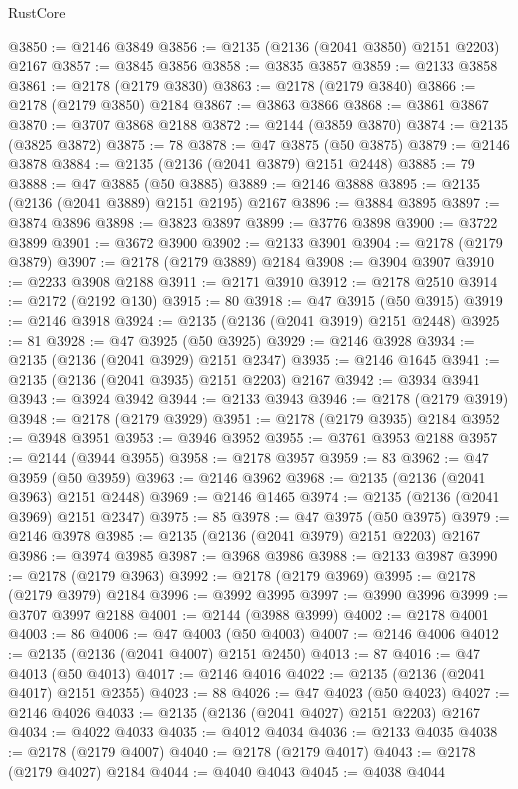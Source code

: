 \begin{lexlean}{RustCore}
\begin{coremodule}
@3850 := @2146 @3849
@3856 := @2135 (@2136 (@2041 @3850) @2151 @2203) @2167
@3857 := @3845 @3856
@3858 := @3835 @3857
@3859 := @2133 @3858
@3861 := @2178 (@2179 @3830)
@3863 := @2178 (@2179 @3840)
@3866 := @2178 (@2179 @3850) @2184
@3867 := @3863 @3866
@3868 := @3861 @3867
@3870 := @3707 @3868 @2188
@3872 := @2144 (@3859 @3870)
@3874 := @2135 (@3825 @3872)
@3875 := 78
@3878 := @47 @3875 (@50 @3875)
@3879 := @2146 @3878
@3884 := @2135 (@2136 (@2041 @3879) @2151 @2448)
@3885 := 79
@3888 := @47 @3885 (@50 @3885)
@3889 := @2146 @3888
@3895 := @2135 (@2136 (@2041 @3889) @2151 @2195) @2167
@3896 := @3884 @3895
@3897 := @3874 @3896
@3898 := @3823 @3897
@3899 := @3776 @3898
@3900 := @3722 @3899
@3901 := @3672 @3900
@3902 := @2133 @3901
@3904 := @2178 (@2179 @3879)
@3907 := @2178 (@2179 @3889) @2184
@3908 := @3904 @3907
@3910 := @2233 @3908 @2188
@3911 := @2171 @3910
@3912 := @2178 @2510
@3914 := @2172 (@2192 @130)
@3915 := 80
@3918 := @47 @3915 (@50 @3915)
@3919 := @2146 @3918
@3924 := @2135 (@2136 (@2041 @3919) @2151 @2448)
@3925 := 81
@3928 := @47 @3925 (@50 @3925)
@3929 := @2146 @3928
@3934 := @2135 (@2136 (@2041 @3929) @2151 @2347)
@3935 := @2146 @1645
@3941 := @2135 (@2136 (@2041 @3935) @2151 @2203) @2167
@3942 := @3934 @3941
@3943 := @3924 @3942
@3944 := @2133 @3943
@3946 := @2178 (@2179 @3919)
@3948 := @2178 (@2179 @3929)
@3951 := @2178 (@2179 @3935) @2184
@3952 := @3948 @3951
@3953 := @3946 @3952
@3955 := @3761 @3953 @2188
@3957 := @2144 (@3944 @3955)
@3958 := @2178 @3957
@3959 := 83
@3962 := @47 @3959 (@50 @3959)
@3963 := @2146 @3962
@3968 := @2135 (@2136 (@2041 @3963) @2151 @2448)
@3969 := @2146 @1465
@3974 := @2135 (@2136 (@2041 @3969) @2151 @2347)
@3975 := 85
@3978 := @47 @3975 (@50 @3975)
@3979 := @2146 @3978
@3985 := @2135 (@2136 (@2041 @3979) @2151 @2203) @2167
@3986 := @3974 @3985
@3987 := @3968 @3986
@3988 := @2133 @3987
@3990 := @2178 (@2179 @3963)
@3992 := @2178 (@2179 @3969)
@3995 := @2178 (@2179 @3979) @2184
@3996 := @3992 @3995
@3997 := @3990 @3996
@3999 := @3707 @3997 @2188
@4001 := @2144 (@3988 @3999)
@4002 := @2178 @4001
@4003 := 86
@4006 := @47 @4003 (@50 @4003)
@4007 := @2146 @4006
@4012 := @2135 (@2136 (@2041 @4007) @2151 @2450)
@4013 := 87
@4016 := @47 @4013 (@50 @4013)
@4017 := @2146 @4016
@4022 := @2135 (@2136 (@2041 @4017) @2151 @2355)
@4023 := 88
@4026 := @47 @4023 (@50 @4023)
@4027 := @2146 @4026
@4033 := @2135 (@2136 (@2041 @4027) @2151 @2203) @2167
@4034 := @4022 @4033
@4035 := @4012 @4034
@4036 := @2133 @4035
@4038 := @2178 (@2179 @4007)
@4040 := @2178 (@2179 @4017)
@4043 := @2178 (@2179 @4027) @2184
@4044 := @4040 @4043
@4045 := @4038 @4044

\end{coremodule}
\end{lexlean}
